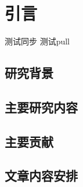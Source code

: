 \chapter{引言}
\label{cha:intro}
测试同步
测试pull


\section{研究背景}
\label{sec:background}

\section{主要研究内容}
\label{sec:work}

\section{主要贡献}
\label{sec:contribution}

\section{文章内容安排}
\label{sec:contribution}

